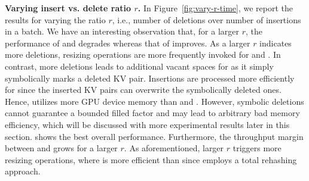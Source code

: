 \vspace{1mm}\noindent\textbf{Varying insert vs. delete ratio $r$.}
In Figure~\ref{fig:vary-r-time}, we report the results for varying the ratio $r$, i.e., number of deletions over number of insertions in a batch.
We have an interesting observation that, for a larger $r$, the performance of \voter and \megakv degrades whereas that of \slab improves. As a larger $r$ indicates more deletions, resizing operations are more frequently invoked for \voter and \megakv. In contrast, more deletions leads to additional vacant spaces for \slab as it simply symbolically marks a deleted KV pair. Insertions are processed more efficiently for \slab since the inserted KV pairs can overwrite the symbolically deleted ones. Hence, \slab utilizes more GPU device memory than \voter and \megakv. However, symbolic deletions cannot guarantee a bounded filled factor and may lead to arbitrary bad memory efficiency, which will be discussed with more experimental results later in this section.
\voter shows the best overall performance. Furthermore, the throughput margin between \voter and \megakv grows for a larger $r$. 
As aforementioned, larger $r$ triggers more resizing operations, where \voter is more efficient than \megakv since \megakv employs a total rehashing approach. 



